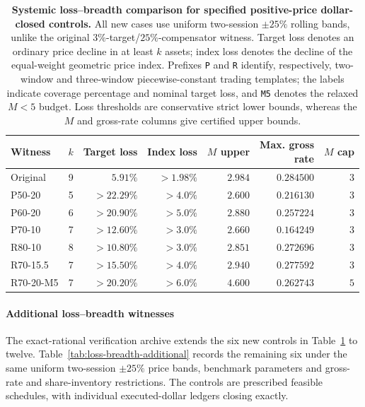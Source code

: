\documentclass[review,hidelinks,onefignum,onetabnum]{siamonline250211}
\begin{document}
\begin{table}[H]\centering\small
\caption{\textbf{Systemic loss--breadth comparison for specified
positive-price dollar-closed controls.} All new cases use uniform
two-session $\pm25\%$ rolling bands, unlike the original
$3\%$-target/$25\%$-compensator witness. Target loss denotes an
ordinary price decline in at least $k$ assets; index loss
denotes the decline of the equal-weight geometric price index.
Prefixes \texttt{P} and \texttt{R} identify, respectively,
two-window and three-window piecewise-constant trading templates;
the labels indicate coverage percentage and nominal target loss,
and \texttt{M5} denotes the relaxed $M<5$ budget. Loss
thresholds are conservative strict lower bounds, whereas the
$M$ and gross-rate columns give certified upper bounds.}
\label{tab:loss-breadth}
\begin{tabular}{@{}lrrrrrr@{}}\toprule
Witness & $k$ & Target loss & Index loss & $M$ upper &
\shortstack{Max. gross\\rate} & $M$ cap\\\midrule
Original & 9 & $5.91\%$ & $>1.98\%$ & $2.984$ & $0.284500$ & $3$\\
P50-20 & 5 & $>22.29\%$ & $>4.0\%$ & $2.600$ & $0.216130$ & $3$\\
P60-20 & 6 & $>20.90\%$ & $>5.0\%$ & $2.880$ & $0.257224$ & $3$\\
P70-10 & 7 & $>12.60\%$ & $>3.0\%$ & $2.660$ & $0.164249$ & $3$\\
R80-10 & 8 & $>10.80\%$ & $>3.0\%$ & $2.851$ & $0.272696$ & $3$\\
R70-15.5 & 7 & $>15.50\%$ & $>4.0\%$ & $2.940$ & $0.277592$ & $3$\\
R70-20-M5 & 7 & $>20.20\%$ & $>6.0\%$ & $4.600$ & $0.262743$ & $5$\\
\bottomrule\end{tabular}
\end{table}

\paragraph{Additional loss--breadth witnesses}
The exact-rational verification archive
 extends the six new controls
in Table~\ref{tab:loss-breadth} to twelve. Table~\ref{tab:loss-breadth-additional}
records the remaining six under the same uniform two-session
$\pm25\%$ price bands, benchmark parameters and gross-rate
and share-inventory restrictions. The controls are prescribed
feasible schedules, with individual executed-dollar ledgers
closing exactly.
\end{document}
